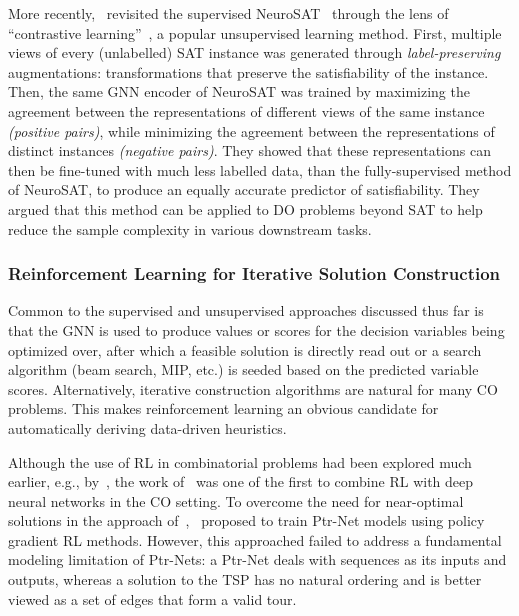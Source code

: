 \documentclass[twoside,11pt]{article}
\begin{document}
More recently,~\citet{duan2022augment} revisited the supervised NeuroSAT~\citep{Sel+2019} through the lens of ``contrastive learning''~\citep{chen2020simple}, a popular unsupervised learning method. First, multiple views of every (unlabelled) SAT instance was generated through \emph{label-preserving} augmentations: transformations that preserve the satisfiability of the instance. Then, the same GNN encoder of NeuroSAT was trained by maximizing the agreement between the representations of different views of the same instance \emph{(positive pairs)}, while minimizing the agreement between the representations of distinct instances \emph{(negative pairs)}. They showed that these representations can then be fine-tuned with much less labelled data, than the fully-supervised method of NeuroSAT, to produce an equally accurate predictor of satisfiability. They argued that this method can be applied to DO problems beyond SAT to help reduce the sample complexity in various downstream tasks.

\subsubsection{Reinforcement Learning for Iterative Solution Construction}
Common to the supervised and unsupervised approaches discussed thus far is that the GNN is used to produce values or scores for the decision variables being optimized over, after which a feasible solution is directly read out or a search algorithm (beam search, MIP, etc.) is seeded based on the predicted variable scores. Alternatively, iterative construction algorithms are natural for many CO problems. This makes reinforcement learning an obvious candidate for automatically deriving data-driven heuristics.

Although the use of RL in combinatorial problems had been explored much earlier, e.g., by~\citet{zhang1995reinforcement}, the work of~\citet{bello2016neural} was one of the first to combine RL with deep neural networks in the CO setting. To overcome the need for near-optimal solutions in the approach of~\citet{Vinyals2015},~\citet{bello2016neural} proposed to train Ptr-Net models using policy gradient RL methods. However, this approached failed to address a fundamental modeling limitation of Ptr-Nets: a Ptr-Net deals with sequences as its inputs and outputs, whereas a solution to the TSP has no natural ordering and is better viewed as a set of edges that form a valid tour.
\end{document}
